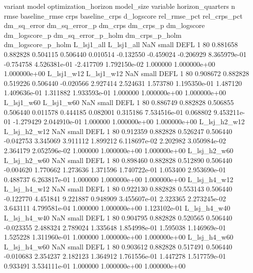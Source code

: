        variant          model  optimization_horizon model_size variable  horizon_quarters  n     rmse  baseline_rmse     crps  baseline_crps  d_logscore  rel_rmse_pct  rel_crps_pct  dm_sq_error  dm_sq_error_p   dm_crps    dm_crps_p  dm_logscore  dm_logscore_p  dm_sq_error_p_holm  dm_crps_p_holm  dm_logscore_p_holm
    L_lsj1_all     L_lsj1_all                   NaN      small     DEFL                 1 80 0.881658       0.882828 0.504115       0.506440    0.010514     -0.132550     -0.459024    -0.206929   8.365979e-01 -0.754758 4.526381e-01    -2.417709   1.792150e-02            1.000000    1.000000e+00        1.000000e+00
    L_lsj1_w12     L_lsj1_w12                   NaN      small     DEFL                 1 80 0.908672       0.882828 0.519226       0.506440   -0.020566      2.927414      2.524631     1.573780   1.195350e-01  1.487120 1.409636e-01     1.311882   1.933593e-01            1.000000    1.000000e+00        1.000000e+00
    L_lsj1_w60     L_lsj1_w60                   NaN      small     DEFL                 1 80 0.886749       0.882828 0.506855       0.506440    0.011578      0.444185      0.082001     0.315186   7.534516e-01  0.068802 9.453211e-01    -1.279429   2.044910e-01            1.000000    1.000000e+00        1.000000e+00
  L_lsj_h2_w12   L_lsj_h2_w12                   NaN      small     DEFL                 1 80 0.912359       0.882828 0.526247       0.506440   -0.042753      3.345069      3.911112     1.899212   6.118697e-02  2.202982 3.050984e-02     2.364179   2.052596e-02            1.000000    1.000000e+00        1.000000e+00
  L_lsj_h2_w60   L_lsj_h2_w60                   NaN      small     DEFL                 1 80 0.898460       0.882828 0.512890       0.506440   -0.004620      1.770662      1.273636     1.371596   1.740722e-01  1.053400 2.953690e-01     0.488737   6.263817e-01            1.000000    1.000000e+00        1.000000e+00
  L_lsj_h4_w12   L_lsj_h4_w12                   NaN      small     DEFL                 1 80 0.922130       0.882828 0.553143       0.506440   -0.122770      4.451841      9.221887     0.948909   3.455607e-01  2.323365 2.273245e-02     3.643111   4.799581e-04            1.000000    1.000000e+00        1.123102e-01
  L_lsj_h4_w40   L_lsj_h4_w40                   NaN      small     DEFL                 1 80 0.904795       0.882828 0.520565       0.506440   -0.023355      2.488324      2.789024     1.335648   1.854998e-01  1.595038 1.146969e-01     1.525228   1.311960e-01            1.000000    1.000000e+00        1.000000e+00
  L_lsj_h4_w60   L_lsj_h4_w60                   NaN      small     DEFL                 1 80 0.903612       0.882828 0.517491       0.506440   -0.010683      2.354237      2.182123     1.364912   1.761556e-01  1.447278 1.517759e-01     0.933491   3.534111e-01            1.000000    1.000000e+00        1.000000e+00
